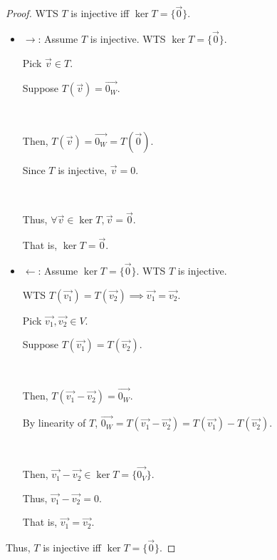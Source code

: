 \documentclass[11pt,fleqn]{book} %
\begin{document}
\begin{proof}
    WTS $T$ is injective iff $\ker T = \{\overrightarrow{0} \}$.
    
    \begin{itemize}
        \item $\rightarrow$: Assume $T$ is injective. WTS $\ker T = \{\overrightarrow{0} \}$. 
        
        Pick $\overrightarrow{v} \in T$. 
        
        Suppose $T(\overrightarrow{v})=\overrightarrow{0_W}$. 
        
        {~~~}

        Then, $T(\overrightarrow{v}) = \overrightarrow{0_W} = T(\overrightarrow{0})$. 
        
        Since $T$ is injective, $\overrightarrow{v} = 0$. 
        
        {~~~}

        Thus, $\forall \overrightarrow{v} \in \ker T, \overrightarrow{v} = \overrightarrow{0}$.
        
        That is, $\ker T=\overrightarrow{0}$. 
        
        \item $\leftarrow$: Assume $\ker T = \{\overrightarrow{0} \}$. WTS $T$ is injective. 
        
        WTS $T(\overrightarrow{v_1}) = T(\overrightarrow{v_2}) \implies \overrightarrow{v_1} = \overrightarrow{v_2}$. 

        Pick $\overrightarrow{v_1}, \overrightarrow{v_2} \in V$. 
        
        Suppose $T(\overrightarrow{v_1})=T(\overrightarrow{v_2})$. 

        {~~~}

        Then, $T(\overrightarrow{v_1} - \overrightarrow{v_2}) = \overrightarrow{0_W}$. 
        
        By linearity of $T$, $\overrightarrow{0_W} = T(\overrightarrow{v_1} - \overrightarrow{v_2}) = T(\overrightarrow{v_1}) - T(\overrightarrow{v_2})$. 
        
        {~~~}

        Then, $\overrightarrow{v_1} - \overrightarrow{v_2} \in \ker T = \{ \overrightarrow{0_V} \}$. 
        
        Thus, $\overrightarrow{v_1} - \overrightarrow{v_2} = 0$. 
        
        That is, $\overrightarrow{v_1} = \overrightarrow{v_2}$. 
    \end{itemize}
    
    Thus, $T$ is injective iff $\ker T = \{\overrightarrow{0} \}$. 
\end{proof}
\end{document}

